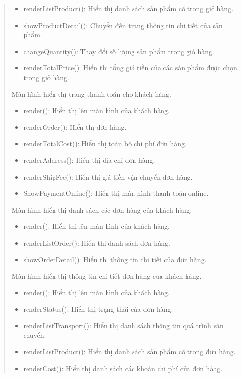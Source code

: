 \begin{quote}
\begin{itemize}
			\item renderListProduct(): Hiển thị danh sách sản phẩm có trong giỏ hàng.
			\item showProductDetail(): Chuyển đến trang thông tin chi tiết của sản phẩm.
			\item changeQuantity(): Thay đổi số lượng sản phẩm trong giỏ hàng.
			\item renderTotalPrice(): Hiển thị tổng giá tiền của các sản phẩm được chọn trong giỏ hàng.
		\end{itemize}
		Màn hình hiển thị trang thanh toán cho khách hàng.
		\begin{itemize}
			\item render(): Hiển thị lên màn hình của khách hàng.
			\item renderOrder(): Hiển thị đơn hàng.
			\item renderTotalCost(): Hiển thị toán bộ chi phí đơn hàng.
			\item renderAddress(): Hiển thị địa chỉ đơn hàng.
			\item renderShipFee(): Hiển thị giá tiền vận chuyển đơn hàng.
			\item ShowPaymentOnline(): Hiển thị màn hình thanh toán online.
		\end{itemize}
		Màn hình hiển thị danh sách các đơn hàng của khách hàng.
		\begin{itemize}
			\item render(): Hiển thị lên màn hình của khách hàng.
			\item renderListOrder(): Hiển thị danh sách đơn hàng.
			\item showOrderDetail(): Hiển thị thông tin chi tiết của đơn hàng.
		\end{itemize}
		Màn hình hiển thị thông tin chi tiết đơn hàng của khách hàng.
		\begin{itemize}
			\item render(): Hiển thị lên màn hình của khách hàng.
			\item renderStatus(): Hiển thị trạng thái của đơn hàng.
			\item renderListTransport(): Hiển thị danh sách thông tin quá trình vận chuyển.
			\item renderListProduct(): Hiển thị danh sách sản phẩm có trong đơn hàng.
			\item renderCost(): Hiển thị danh sách các khoản chi phí của đơn hàng.
		\end{itemize}

\end{quote}
